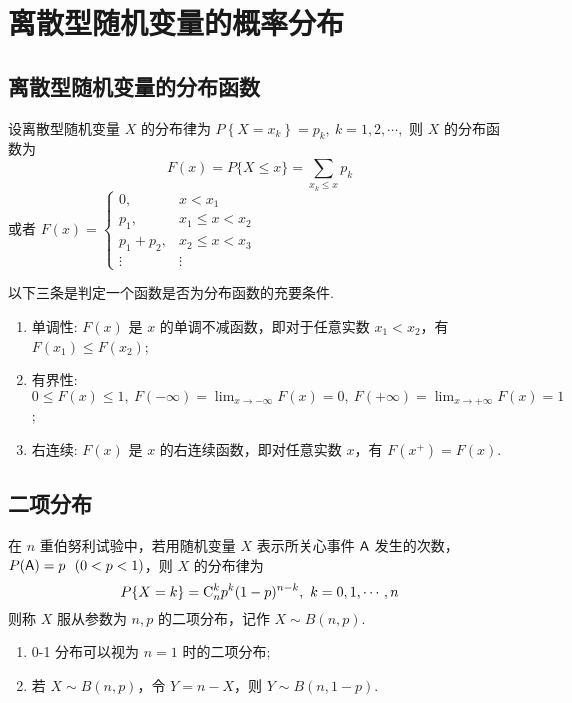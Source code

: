 \section{离散型随机变量的概率分布}

\subsection{离散型随机变量的分布函数}

\begin{definition}[分布函数]
    设离散型随机变量 $ X $ 的分布律为
    $P\left\{X=x_{k}\right\}=p_{k},~k=1,2, \cdots,$ 则 $ X $ 的分布函数为
    $$F(x)=P\{X \leqslant x\}=\sum_{x_{k} \leqslant x} p_{k}$$
    或者
    $F(x)=\begin{cases}
            0,           & x<x_{1}                 \\
            p_{1},       & x_{1} \leqslant x<x_{2} \\
            p_{1}+p_{2}, & x_{2} \leqslant x<x_{3} \\
            \vdots       & \vdots
        \end{cases}$
\end{definition}

\begin{theorem}[分布函数的性质]
    以下三条是判定一个函数是否为分布函数的充要条件.
    \begin{enumerate}[label=(\arabic{*})]
        \item 单调性: $F(x) $ 是 $ x $ 的单调不减函数，即对于任意实数 $ x_{1}<x_{2}$，有 $ F\left(x_{1}\right) \leqslant F\left(x_{2}\right) $;
        \item 有界性: $\displaystyle0 \leqslant F(x) \leqslant 1 ,~F(-\infty)=\lim _{x \rightarrow-\infty} F(x)=0,~F(+\infty)=\lim_{x\to+\infty}F(x)=1$;
        \item 右连续: $F(x)$ 是 $x$ 的右连续函数，即对任意实数 $x$，有 $F(x^+)=F(x).$
    \end{enumerate}
\end{theorem}

\subsection{二项分布}

\begin{definition}[二项分布]
    在 $ n $ 重伯努利试验中，若用随机变量 $ X $ 表示所关心事件 $ \mathsf{A} $ 发生的次数，$P(\mathsf{A})=p~~(0<p<1)$，则 $ X $ 的分布律为
    $$P\{X=k\}=\mathrm{C}_{n}^{k} p^{k}(1-p)^{n-k}, ~k=0,1, \cdots, n$$
    则称 $ X $ 服从参数为 $ n, p $ 的二项分布，记作 $ X \sim B(n, p) $.
    \begin{enumerate}[label=(\arabic{*})]
        \item 0-1 分布可以视为 $ n=1 $ 时的二项分布;
        \item 若 $ X \sim B(n, p) $，令 $ Y=n-X$，则 $ Y \sim B(n, 1-p) .$
    \end{enumerate}
\end{definition}

